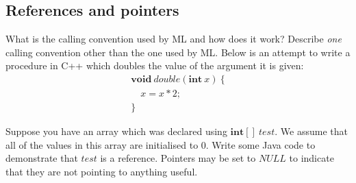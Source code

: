 \documentclass[10pt,a4paper,fleqn]{exam}
\begin{document}
\begin{questions}
\section{References and pointers}

\question What is the calling convention used by ML and how does it work?
\question Describe \emph{one} calling convention other than the one used by ML.
\question Below is an attempt to write a procedure in C++ which doubles the value of the argument it is given:
\begin{displaymath}
\begin{array}{l}
\mathbf{void}~\mathit{double}(\mathbf{int}~x)~\{ \\
\quad x = x*2;\\
\}
\end{array}
\end{displaymath}
\question Suppose you have an array which was declared using $\mathbf{int}[]~\mathit{test}$. We assume that all of the values in this array are initialised to 0. Write some Java code to demonstrate that $\mathit{test}$ is a reference.
\question Pointers may be set to $\mathit{NULL}$ to indicate that they are not pointing to anything useful.
\begin{parts}

\end{parts}
\end{questions}
\end{document}
